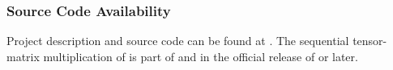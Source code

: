 \subsubsection{Source Code Availability}
Project description and source code can be found at {\footnotesize {}}.
The sequential tensor-matrix multiplication of  is part of  and in the official release of   or later.
